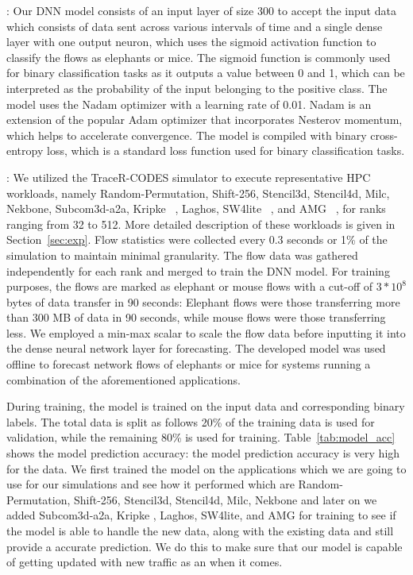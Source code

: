 \vspace{0.08in}
:
Our DNN model consists of an input layer of size 300 to accept the input data
which consists of data sent across various intervals of time and a single dense layer with
one output neuron, which uses the sigmoid activation function to classify the flows as elephants or mice.
The sigmoid function is commonly used for binary classification tasks
as it outputs a value between 0 and 1, which can be 
interpreted as the probability of the input belonging to the positive class. 
The model uses the Nadam optimizer with a learning rate of 0.01. Nadam is an 
extension of the popular Adam optimizer that incorporates Nesterov momentum, 
which helps to accelerate convergence. The model is compiled with binary 
cross-entropy loss, which is a standard loss function used for binary 
classification tasks.

\vspace{0.08in}
:
We utilized the TraceR-CODES simulator to execute representative HPC 
workloads, namely Random-Permutation, Shift-256, Stencil3d, Stencil4d, Milc, Nekbone, Subcom3d-a2a, Kripke ~\cite{kripke}, Laghos, 
SW4lite ~\cite{sjogreen2018sw4}, and AMG ~\cite{amg}, 
for ranks ranging from 32 to 512. More detailed description of these
workloads is given in Section~\ref{sec:exp}.
Flow statistics were collected every 0.3 
seconds or 1\%
of the simulation to maintain minimal granularity. The flow data 
was gathered independently for each rank and merged to train the DNN 
model. For training purposes, the flows are marked as elephant or
mouse flows with a cut-off of $3 * 10^8$ bytes of data transfer in 90 seconds: 
Elephant flows were those transferring more than 300 MB of data in
90 seconds, while mouse flows were 
those transferring less. We employed a min-max scalar to scale the flow data 
before inputting it into the dense neural network layer for forecasting. The 
developed model was used offline to forecast network flows of elephants
or mice for systems running a combination of the aforementioned
applications.

During training, the model is trained on the input data and
corresponding binary labels. The total data is split as follows 20\%
of the training data is used for validation, while the remaining 80\% is 
used for training. Table~\ref{tab:model_acc} shows the model prediction
accuracy: the model prediction accuracy is very high for the data. 
We first trained the model on the applications which we are going to use for our simulations and 
see how it performed which are Random-Permutation, Shift-256, Stencil3d, Stencil4d, Milc, Nekbone and later on we added Subcom3d-a2a, Kripke , Laghos, SW4lite, and AMG for training to see if the model is able to handle the new data, along with the existing data and still provide a accurate prediction. We do this to make sure that our model is capable of getting  updated with new traffic as an when it comes. 

